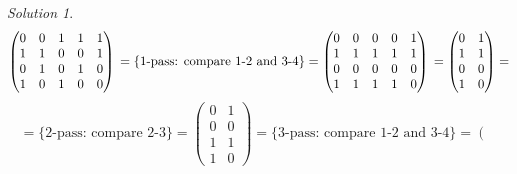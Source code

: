 \documentclass[a4paper,twoside=false,abstract=false,numbers=noenddot,
titlepage=false,headings=small,parskip=half,version=last]{scrartcl}
\theoremstyle{definition}
\theoremstyle{remark}
\newtheorem*{solution}{Solution}
\begin{document}
\begin{solution}
    \begin{equation*} 
        \left(
        \begin{matrix}
            
                                     0 & 0 & 1 & 1 & 1 \\
                                     1 & 1 & 0 & 0 & 1 \\
                                     0 & 1 & 0 & 1 & 0 \\
                                     1 & 0 & 1 & 0 & 0
       \end{matrix}
       \right) \\
        = \{\mbox{1-pass: compare 1-2 and 3-4}\} =
        \left(
        \begin{matrix}
            
                                     0 & 0 & 0 & 0 & 1 \\
                                     1 & 1 & 1 & 1 & 1 \\
                                     0 & 0 & 0 & 0 & 0 \\
                                     1 & 1 & 1 & 1 & 0
       \end{matrix}
       \right) \\
        =
        \left(
        \begin{matrix}
            
                                     0 & 1 \\
                                     1 & 1 \\
                                     0 & 0 \\
                                     1 & 0
       \end{matrix}
       \right)
       =
    \end{equation*}
    \begin{equation*}
       = \{\mbox{2-pass: compare 2-3}\} =
        \left(
        \begin{matrix}
            
                                     0 & 1 \\
                                     0 & 0 \\
                                     1 & 1 \\
                                     1 & 0
       \end{matrix}
       \right)
        = \{\mbox{3-pass: compare 1-2 and 3-4}\} =
        \left(
        \begin{matrix}
            

\end{matrix}
\end{equation*}
\end{solution}
\end{document}
